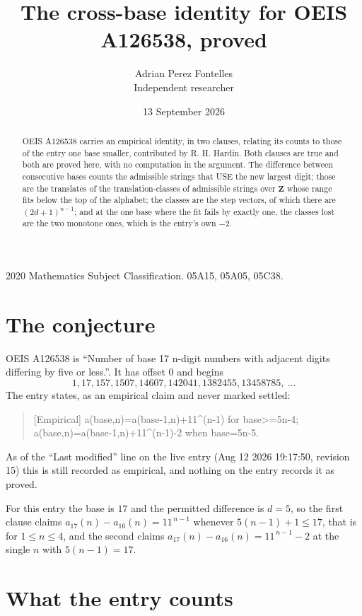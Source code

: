 \documentclass[11pt,a4paper]{article}
\title{The cross-base identity for OEIS A126538, proved}
\author{Adrian Perez Fontelles\\ \small Independent researcher}
\date{13 September 2026}
\theoremstyle{plain}
\theoremstyle{definition}
\begin{document}
\maketitle

\begin{abstract}
OEIS A126538 carries an empirical identity, in two clauses, relating its counts to those of the
entry one base smaller, contributed by R. H. Hardin. Both clauses are true and both are proved
here, with no computation in the argument. The difference between consecutive bases counts the
admissible strings that USE the new largest digit; those are the translates of the
translation-classes of admissible strings over $\mathbf{Z}$ whose range fits below the top of
the alphabet; the classes are the step vectors, of which there are $(2d+1)^{n-1}$; and at the
one base where the fit fails by exactly one, the classes lost are the two monotone ones, which
is the entry's own $-2$.
\end{abstract}

\noindent\small 2020 Mathematics Subject Classification. 05A15, 05A05, 05C38.\normalsize

\section{The conjecture}

OEIS A126538 is ``Number of base 17 n-digit numbers with adjacent digits differing by five or less.''. It has offset $0$ and begins
\[
1, 17, 157, 1507, 14607, 142041, 1382455, 13458785,\ \dots
\]
The entry states, as an empirical claim and never marked settled:
\begin{quote}
[Empirical] a(base,n)=a(base-1,n)+11\textasciicircum{}(n-1) for base>=5n-4; a(base,n)=a(base-1,n)+11\textasciicircum{}(n-1)-2 when base=5n-5.
\end{quote}
As of the ``Last modified'' line on the live entry (Aug 12 2026 19:17:50, revision 15)
this is still recorded as empirical, and nothing on the entry records it as proved.

For this entry the base is $17$ and the permitted difference is $d=5$, so the first clause
claims $a_{17}(n)-a_{16}(n)=11^{\,n-1}$ whenever $5(n-1)+1\le17$, that is for
$1\le n\le4$, and the second claims $a_{17}(n)-a_{16}(n)=11^{\,n-1}-2$ at the single
$n$ with $5(n-1)=17$.

\section{What the entry counts}
\end{document}
